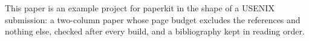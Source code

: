 This paper is an example project for paperkit in the shape of a USENIX
submission: a two-column paper whose page budget excludes the references and
nothing else, checked after every build, and a bibliography kept in reading
order.
